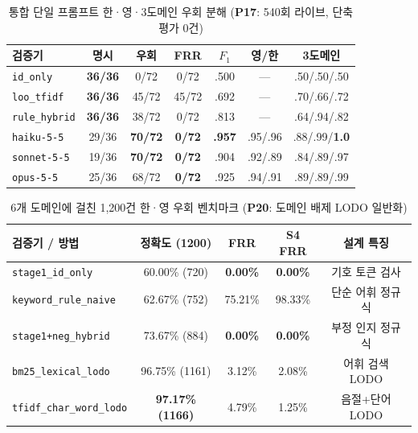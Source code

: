 \begin{table}[!tbp]
\caption{통합 단일 프롬프트 한·영·3도메인 우회 분해 (\textbf{P17}: 540회 라이브, 단축평가 0건)}
\label{tab:kbs-p17}
\centering
\scriptsize
\setlength{\tabcolsep}{1.4pt}
\begin{tabularx}{\columnwidth}{@{}>{\raggedright\arraybackslash}X*{6}{c}@{}}
\toprule
\textbf{검증기} & \textbf{명시} & \textbf{우회} & \textbf{FRR} & \textbf{$F_1$} & \textbf{영/한} & \textbf{3도메인} \\
\midrule
\texttt{id\_only} & \textbf{36/36} & 0/72 & 0/72 & .500 & --- & .50/.50/.50 \\
\texttt{loo\_tfidf} & \textbf{36/36} & 45/72 & 45/72 & .692 & --- & .70/.66/.72 \\
\texttt{rule\_hybrid} & \textbf{36/36} & 38/72 & 0/72 & .813 & --- & .64/.94/.82 \\
\texttt{haiku-5-5} & 29/36 & \textbf{70/72} & \textbf{0/72} & \textbf{.957} & .95/.96 & .88/.99/\textbf{1.0} \\
\texttt{sonnet-5-5} & 19/36 & \textbf{70/72} & \textbf{0/72} & .904 & .92/.89 & .84/.89/.97 \\
\texttt{opus-5-5} & 25/36 & 68/72 & \textbf{0/72} & .925 & .94/.91 & .89/.89/.99 \\
\bottomrule
\end{tabularx}
\end{table}

\begin{table}[!tbp]
\caption{6개 도메인에 걸친 1,200건 한·영 우회 벤치마크 (\textbf{P20}: 도메인 배제 LODO 일반화)}
\label{tab:p20}
\centering
\scriptsize
\setlength{\tabcolsep}{2.0pt}
\begin{tabularx}{\columnwidth}{@{}>{\raggedright\arraybackslash}Xcccc@{}}
\toprule
\textbf{검증기 / 방법} & \textbf{정확도 (1200)} & \textbf{FRR} & \textbf{S4 FRR} & \textbf{설계 특징} \\
\midrule
\texttt{stage1\_id\_only} & 60.00\% (720) & \textbf{0.00\%} & \textbf{0.00\%} & 기호 토큰 검사 \\
\texttt{keyword\_rule\_naive} & 62.67\% (752) & 75.21\% & 98.33\% & 단순 어휘 정규식 \\
\texttt{stage1+neg\_hybrid} & 73.67\% (884) & \textbf{0.00\%} & \textbf{0.00\%} & 부정 인지 정규식 \\
\texttt{bm25\_lexical\_lodo} & 96.75\% (1161) & 3.12\% & 2.08\% & 어휘 검색 LODO \\
\texttt{tfidf\_char\_word\_lodo} & \textbf{97.17\% (1166)} & 4.79\% & 1.25\% & 음절+단어 LODO \\
\bottomrule
\end{tabularx}
\end{table}

